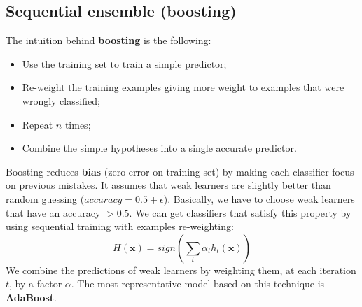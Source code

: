 \subsection{Sequential ensemble (boosting)}
The intuition behind \textbf{boosting} is the following:
\begin{itemize}
    \item Use the training set to train a simple predictor;
    \item Re-weight the training examples giving more weight to examples that were wrongly classified;
    \item Repeat $n$ times;
    \item Combine the simple hypotheses into a single accurate predictor.
\end{itemize}
Boosting reduces \textbf{bias} (zero error on training set) by making each classifier focus on previous mistakes. It assumes that weak learners are slightly better than random guessing ($accuracy = 0.5 + \epsilon$). Basically, we have to choose weak learners that have an accuracy $> 0.5$. We can get classifiers that satisfy this property by using sequential training with examples re-weighting:
\[H(\textbf{x}) = sign\left(\sum_{t}\alpha_{t}h_{t}(\textbf{x})\right)\]
We combine the predictions of weak learners by weighting them, at each iteration $t$, by a factor $\alpha$.\newline\newline
The most representative model based on this technique is \textbf{AdaBoost}.
